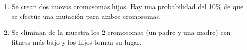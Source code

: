 \begin{enumerate}[\hspace*{0.5cm} P{a}so 1]
\item Se crean dos nuevos cromosomas hijos. Hay una probabilidad del 10\% de que se efectúe una mutación para ambos cromosomas.
\item Se eliminan de la muestra los 2 cromosomas (un padre y una madre) con fitness más bajo y los hijos toman su lugar.
\end{enumerate}



